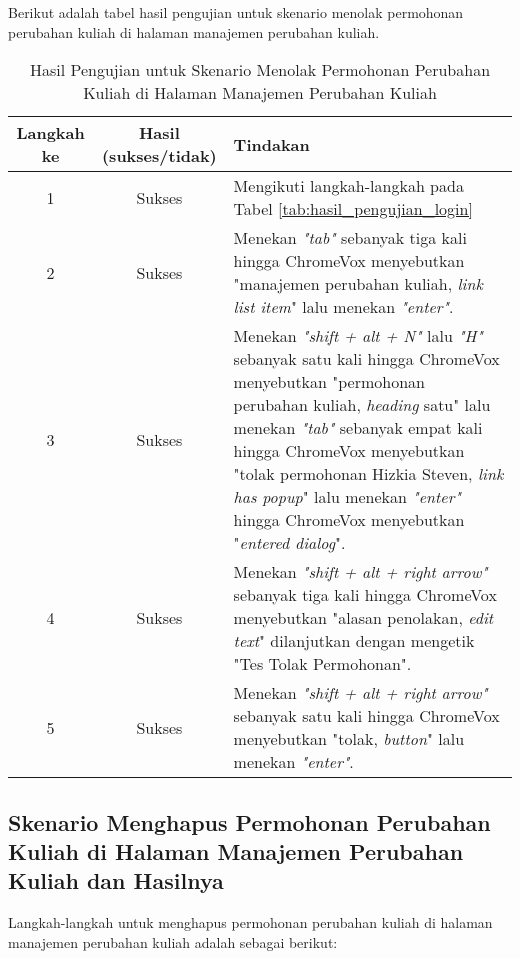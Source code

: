 Berikut adalah tabel hasil pengujian untuk skenario menolak permohonan perubahan kuliah di halaman manajemen perubahan kuliah.

\begin{table}[H]
    \centering 
    \caption{Hasil Pengujian untuk Skenario Menolak Permohonan Perubahan Kuliah di Halaman Manajemen Perubahan Kuliah}
    \label{tab:hasil_pengujian_menolak_permohonan_perubahan_kuliah_di_halaman_manajemen_perubahan_kuliah}
    \begin{tabular}{|c|c|p{10cm}|}
        \toprule
        Langkah ke & Hasil (sukses/tidak) & Tindakan \\

        \midrule
        1 & Sukses & Mengikuti langkah-langkah pada Tabel \ref{tab:hasil_pengujian_login} \\
        2 & Sukses & Menekan \textit{"tab"} sebanyak tiga kali hingga ChromeVox menyebutkan "manajemen perubahan kuliah, \textit{link list item}" lalu menekan \textit{"enter"}. \\
        3 & Sukses & Menekan \textit{"shift + alt + N"} lalu \textit{"H"} sebanyak satu kali hingga ChromeVox menyebutkan "permohonan perubahan kuliah, \textit{heading} satu" lalu menekan \textit{"tab"} sebanyak empat kali hingga ChromeVox menyebutkan "tolak permohonan Hizkia Steven, \textit{link has popup}" lalu menekan \textit{"enter"} hingga ChromeVox menyebutkan "\textit{entered dialog}". \\
        4 & Sukses & Menekan \textit{"shift + alt + right arrow"} sebanyak tiga kali hingga ChromeVox menyebutkan "alasan penolakan, \textit{edit text}" dilanjutkan dengan mengetik "Tes Tolak Permohonan". \\
        5 & Sukses & Menekan \textit{"shift + alt + right arrow"} sebanyak satu kali hingga ChromeVox menyebutkan "tolak, \textit{button}" lalu menekan \textit{"enter"}. \\ 

        \bottomrule

    \end{tabular}
\end{table}

\subsection{Skenario Menghapus Permohonan Perubahan Kuliah di Halaman Manajemen Perubahan Kuliah dan Hasilnya}
\label{subsec:skenario_menghapus_permohonan_perubahan_kuliah_di_halaman_manajemen_perubahan_kuliah}
Langkah-langkah untuk menghapus permohonan perubahan kuliah di halaman manajemen perubahan kuliah adalah sebagai berikut:


